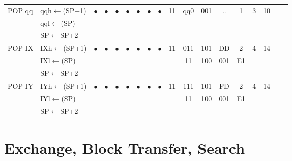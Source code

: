 \documentclass[oneside,a4paper]{book}
\newcommand{\instrt}{\rule{0pt}{2.7ex}}
\newcommand{\instrb}{\rule[-1.7ex]{0pt}{0pt}}
\begin{document}
{\begin{tabular}{llcccccccccccccccl}
		POP qq\instrt & 
			qqh$\leftarrow$(SP+1) &
			$\bullet$ & 
				$\bullet$ & 
				$\bullet$ & 
				$\bullet$ & 
				$\bullet$ & 
				$\bullet$ & 
				$\bullet$ & 
			11 & qq0 & 001 & 
			.. & 1 & 
			3 & 10 & \\
		& qql$\leftarrow$(SP) & \\
		& SP$\leftarrow$SP+2 & \instrb \\

		POP IX\instrt & 
			IXh$\leftarrow$(SP+1) &
			$\bullet$ & 
				$\bullet$ & 
				$\bullet$ & 
				$\bullet$ & 
				$\bullet$ & 
				$\bullet$ & 
				$\bullet$ & 
			11 & 011 & 101 & 
			DD & 2 & 
			4 & 14 & \\ 
		& IXl$\leftarrow$(SP) & \multicolumn{8}{c}{} & 11 & 100 & 001 & E1 & & & \\
		& SP$\leftarrow$SP+2 & \instrb \\

		POP IY\instrt &
			IYh$\leftarrow$(SP+1) &
			$\bullet$ & 
				$\bullet$ & 
				$\bullet$ & 
				$\bullet$ & 
				$\bullet$ & 
				$\bullet$ & 
				$\bullet$ & 
			11 & 111 & 101 & 
			FD & 2 & 
			4 & 14 & \\ 
		& IYl$\leftarrow$(SP) & \multicolumn{8}{c}{} & 11 & 100 & 001 & E1 & & & \\
		& SP$\leftarrow$SP+2 & \instrb \\

		\hline

	\end{tabular}
}


\section{Exchange, Block Transfer, Search}
\end{document}
